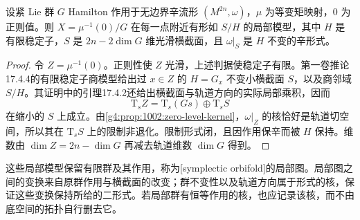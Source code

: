 \begin{proposition}\label{g4:prop:1004:regular-local-finite-quotient}
	设紧 Lie 群 \(G\) Hamilton 作用于无边界辛流形 \((M^{2n},\omega)\)，\(\mu\) 为等变矩映射，\(0\) 为正则值。则 \(X=\mu^{-1}(0)/G\) 在每一点附近有形如 \(S/H\) 的局部模型，其中 \(H\) 是有限稳定子，\(S\) 是 \(2n-2\dim G\) 维光滑横截面，且 \(\omega|_S\) 是 \(H\) 不变的辛形式。
\end{proposition}

\begin{proof}
	令 \(Z=\mu^{-1}(0)\)。正则性使 \(Z\) 光滑，上述判据使稳定子有限。第一卷推论17.4.4的有限稳定子商模型给出过 \(x\in Z\) 的 \(H=G_x\) 不变小横截面 \(S\)，以及商邻域 \(S/H\)。其证明中的引理17.4.2还给出横截面与轨道方向的实际局部乘积，因而
	\[
		\mathrm{T}_sZ=\mathrm{T}_s(Gs)\oplus\mathrm{T}_sS
	\]
	在缩小的 \(S\) 上成立。由\cref{g4:prop:1002:zero-level-kernel}，\(\omega|_Z\) 的核恰好是轨道切空间，所以其在 \(\mathrm{T}_sS\) 上的限制非退化。限制形式闭，且因作用保辛而被 \(H\) 保持。维数由 \(\dim Z=2n-\dim G\) 再减去轨道维数 \(\dim G\) 得到。
\end{proof}

这些局部模型保留有限群及其作用，称为[symplectic orbifold]的局部图。局部图之间的变换来自原群作用与横截面的改变；群不变性以及轨道方向属于形式的核，保证这些变换保持所给的二形式。若局部群有恒等作用的核，也应记录该核，而不由底空间的拓扑自行删去它。

